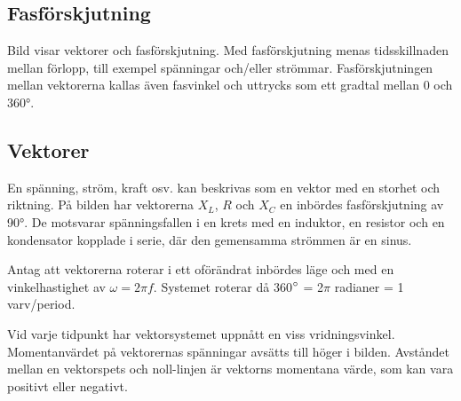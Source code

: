 \subsection{Fasförskjutning}


Bild  visar vektorer och fasförskjutning.
Med fasförskjutning menas tidsskillnaden mellan förlopp, till exempel spänningar
och/eller strömmar.
Fasförskjutningen mellan vektorerna kallas även fasvinkel och uttrycks som ett
gradtal mellan 0 och \ang{360}.

\subsection{Vektorer}

En spänning, ström, kraft osv. kan beskrivas som en vektor med en storhet och
riktning.
På bilden  har vektorerna \(X_L\), \(R\) och \(X_C\) en
inbördes fasförskjutning av \ang{90}.
De motsvarar spänningsfallen i en krets med en induktor, en resistor och en
kondensator kopplade i serie, där den gemensamma strömmen är en sinus.

Antag att vektorerna roterar i ett oförändrat inbördes läge och med en
vinkelhastighet av \(\omega= 2\pi f\).
Systemet roterar då 360\(\degree\) = 2\(\pi\) radianer = 1 varv/per\-iod.

Vid varje tidpunkt har vektorsystemet uppnått en viss vridningsvinkel.
Momentanvärdet på vektorernas spänningar avsätts till höger i bilden.
Avståndet mellan en vektorspets och noll-linjen är vektorns momentana värde,
som kan vara positivt eller negativt.
